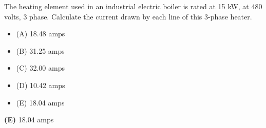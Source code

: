 

The heating element used in an industrial electric boiler is rated at 15 kW, at 480 volts, 3 phase.  Calculate the current drawn by each line of this 3-phase heater.

\begin{itemize}
\item{(A)} 18.48 amps
\vskip 5pt 
\item{(B)} 31.25 amps
\vskip 5pt 
\item{(C)} 32.00 amps
\vskip 5pt 
\item{(D)} 10.42 amps
\vskip 5pt 
\item{(E)} 18.04 amps
\end{itemize}







{\bf (E)} 18.04 amps












